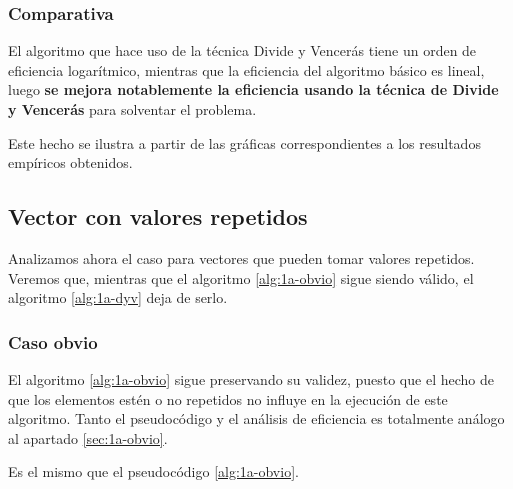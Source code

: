 






\subsubsection{Comparativa}

El algoritmo que hace uso de la técnica Divide y Vencerás tiene un orden de eficiencia logarítmico, mientras
que la eficiencia del algoritmo básico es lineal, luego \textbf{se mejora notablemente la eficiencia usando la técnica de 
Divide y Vencerás} para solventar el problema. 

Este hecho se ilustra a partir de las gráficas correspondientes a los resultados empíricos obtenidos.   %


\subsection{Vector con valores repetidos}

Analizamos ahora el caso para vectores que pueden tomar valores repetidos. Veremos que, mientras que el algoritmo
\ref{alg:1a-obvio} sigue siendo válido, el algoritmo \ref{alg:1a-dyv} deja de serlo. 

\subsubsection{Caso obvio}

El algoritmo \ref{alg:1a-obvio} sigue preservando su validez, puesto que el hecho de que los elementos estén o no
repetidos no influye en la ejecución de este algoritmo. Tanto el pseudocódigo y el análisis de eficiencia es totalmente
análogo al apartado \ref{sec:1a-obvio}. 


Es el mismo que el pseudocódigo \ref{alg:1a-obvio}. 



